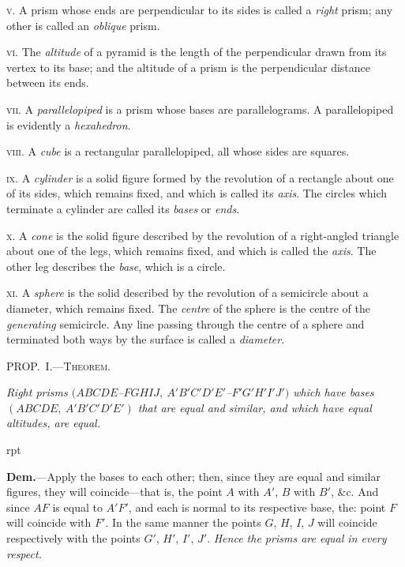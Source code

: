 \documentclass[oneside]{book}
\newcounter{wrapwidth}
\newcommand\mypropl[2]{
\bigskip\Needspace*{4\baselineskip}\begin{center}\textsc{#1}\end{center}
\hspace{\parindent}\emph{#2}\par\medskip
}
\newcommand\imgflow[3]{
\setcounter{wrapwidth}{#1}

\begin{wrapfigure}[#2]{r}{\value{wrapwidth}pt}
\begin{center}
\vspace{-0.3in}

\end{center}
\end{wrapfigure}
}
\begin{document}
\textsc{v.} A prism whose ends are perpendicular to its sides
is called a \textit{right} prism; any other is called an \textit{oblique}
prism.

\textsc{vi.} The \textit{altitude} of a pyramid is the length of the
perpendicular drawn from its vertex to its base; and
the altitude of a prism is the perpendicular distance
between its ends.

\textsc{vii.} A \textit{parallelopiped} is a prism whose bases are
parallelograms. A parallelopiped is evidently a \textit{hexahedron}.



\textsc{viii.} A \textit{cube} is a rectangular parallelopiped, all whose
sides are squares.

\textsc{ix.} A \textit{cylinder} is a solid figure formed by the revolution
of a rectangle about one of its sides, which remains
fixed, and which is called its \textit{axis}. The circles which
terminate a cylinder are called its \textit{bases} or \textit{ends}.

\textsc{x.} A \textit{cone} is the solid figure described by the revolution
of a right-angled triangle about one of the legs,
which remains fixed, and which is called the \textit{axis}. The
other leg describes the \textit{base}, which is a circle.

\textsc{xi.} A \textit{sphere} is the solid described by the revolution
of a semicircle about a diameter, which remains fixed.
The \textit{centre} of the sphere is the centre of the \textit{generating}
semicircle. Any line passing through the centre of
a sphere and terminated both ways by the surface is
called a \textit{diameter}.

\mypropl{PROP\@.~I.---Theorem.}{Right prisms $(ABCDE$--$FGHIJ,\ A'B'C'D'E'$--$F'G'H'I'J')$ which
have ba\-ses $(ABCDE,\ A'B'C'D'E')$ that are equal and similar,
and which have equal altitudes, are equal.}


\imgflow{175}{12}{f236}

\textbf{Dem.}---Apply the bases to each other; then, since
they are equal and
similar figures, they
will coincide---that
is, the point $A$ with
$A'$, $B$ with $B'$, \&c.
And since $AF$ is
equal to $A'F'$, and
each is normal to
its respective base,
the: point $F$ will
coincide with $F'$. In
the same manner the
points $G$, $H$, $I$, $J$ will coincide respectively with the
points $G'$, $H'$, $I'$, $J'$. \textit{Hence the prisms are equal in every
respect.}
\end{document}

